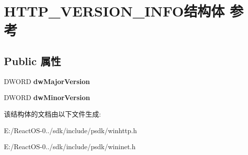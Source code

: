 \hypertarget{struct_h_t_t_p___v_e_r_s_i_o_n___i_n_f_o}{}\section{H\+T\+T\+P\+\_\+\+V\+E\+R\+S\+I\+O\+N\+\_\+\+I\+N\+F\+O结构体 参考}
\label{struct_h_t_t_p___v_e_r_s_i_o_n___i_n_f_o}
\subsection*{Public 属性}
\begin{DoxyCompactItemize}
\item 
\mbox{\label{struct_h_t_t_p___v_e_r_s_i_o_n___i_n_f_o_a6cf0cbba2c81c266a772aeb5c13a7c49}} 
D\+W\+O\+RD {\bfseries dw\+Major\+Version}
\item 
\mbox{\label{struct_h_t_t_p___v_e_r_s_i_o_n___i_n_f_o_a43e08a723220371fb800f2ebbfe0fae5}} 
D\+W\+O\+RD {\bfseries dw\+Minor\+Version}
\end{DoxyCompactItemize}


该结构体的文档由以下文件生成\+:\begin{DoxyCompactItemize}
\item 
E\+:/\+React\+O\+S-\/0../sdk/include/psdk/winhttp.\+h\item 
E\+:/\+React\+O\+S-\/0../sdk/include/psdk/wininet.\+h\end{DoxyCompactItemize}

